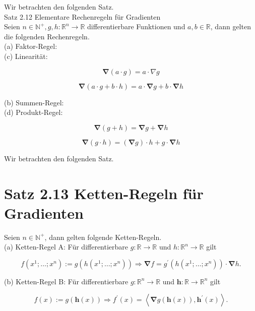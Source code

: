 \documentclass[10pt]{article}
\begin{document}
Wir betrachten den folgenden Satz.\\
Satz 2.12 Elementare Rechenregeln für Gradienten\\
Seien $n \in \mathbb{N}^{+}, g, h: \mathbb{R}^{n} \rightarrow \mathbb{R}$ differentierbare Funktionen und $a, b \in \mathbb{R}$, dann gelten die folgenden Rechenregeln.\\
(a) Faktor-Regel:\\
(c) Linearität:

$$
\boldsymbol{\nabla}(a \cdot g)=a \cdot \nabla g
$$

$$
\boldsymbol{\nabla}(a \cdot g+b \cdot h)=a \cdot \boldsymbol{\nabla} g+b \cdot \boldsymbol{\nabla} h
$$

(b) Summen-Regel:\\
(d) Produkt-Regel:

$$
\boldsymbol{\nabla}(g+h)=\boldsymbol{\nabla} g+\boldsymbol{\nabla} h
$$

$$
\boldsymbol{\nabla}(g \cdot h)=(\boldsymbol{\nabla} g) \cdot h+g \cdot \boldsymbol{\nabla} h
$$

Wir betrachten den folgenden Satz.

\section*{Satz 2.13 Ketten-Regeln für Gradienten}
Seien $n \in \mathbb{N}^{+}$, dann gelten folgende Ketten-Regeln.\\
(a) Ketten-Regel A: Für differentierbare $g: \mathbb{R} \rightarrow \mathbb{R}$ und $h: \mathbb{R}^{n} \rightarrow \mathbb{R}$ gilt

$$
f\left(x^{1} ; \ldots ; x^{n}\right):=g\left(h\left(x^{1} ; \ldots ; x^{n}\right)\right) \Rightarrow \boldsymbol{\nabla} f=g^{\prime}\left(h\left(x^{1} ; \ldots ; x^{n}\right)\right) \cdot \boldsymbol{\nabla} h .
$$

(b) Ketten-Regel B: Für differentierbare $g: \mathbb{R}^{n} \rightarrow \mathbb{R}$ und $\mathbf{h}: \mathbb{R} \rightarrow \mathbb{R}^{n}$ gilt

$$
f(x):=g(\mathbf{h}(x)) \Rightarrow f^{\prime}(x)=\left\langle\boldsymbol{\nabla} g(\mathbf{h}(x)), \mathbf{h}^{\prime}(x)\right\rangle .
$$
\end{document}
